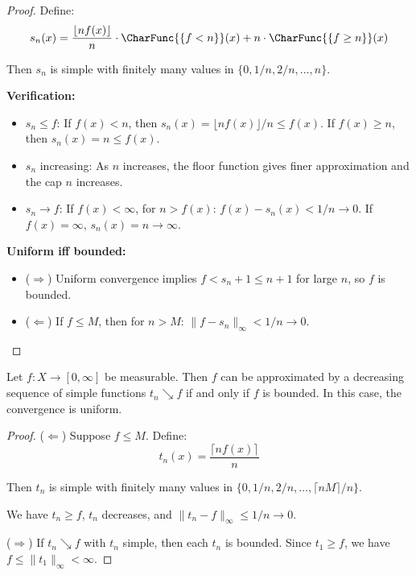 \begin{proof}
Define:
\[ s_n(x) = \frac{\lfloor n f(x) \rfloor}{n} \cdot \CharFunc{\{f < n\}}(x) + n \cdot \CharFunc{\{f \geq n\}}(x) \]

Then $s_n$ is simple with finitely many values in $\{0, 1/n, 2/n, \ldots, n\}$.

\textbf{Verification:}
\begin{itemize}
    \item $s_n \leq f$: If $f(x) < n$, then $s_n(x) = \lfloor nf(x) \rfloor / n \leq f(x)$. If $f(x) \geq n$, then $s_n(x) = n \leq f(x)$.
    \item $s_n$ increasing: As $n$ increases, the floor function gives finer approximation and the cap $n$ increases.
    \item $s_n \to f$: If $f(x) < \infty$, for $n > f(x)$: $f(x) - s_n(x) < 1/n \to 0$. If $f(x) = \infty$, $s_n(x) = n \to \infty$.
\end{itemize}

\textbf{Uniform iff bounded:}
\begin{itemize}
    \item ($\Rightarrow$) Uniform convergence implies $f < s_n + 1 \leq n + 1$ for large $n$, so $f$ is bounded.
    \item ($\Leftarrow$) If $f \leq M$, then for $n > M$: $\|f - s_n\|_\infty < 1/n \to 0$.
\end{itemize}
\end{proof}

\begin{proposition}
Let $f: X \to [0, \infty]$ be measurable. Then $f$ can be approximated by a decreasing sequence of simple functions $t_n \searrow f$ if and only if $f$ is bounded. In this case, the convergence is uniform.
\end{proposition}

\begin{proof}
($\Leftarrow$) Suppose $f \leq M$. Define:
\[ t_n(x) = \frac{\lceil n f(x) \rceil}{n} \]

Then $t_n$ is simple with finitely many values in $\{0, 1/n, 2/n, \ldots, \lceil nM \rceil / n\}$.

We have $t_n \geq f$, $t_n$ decreases, and $\|t_n - f\|_\infty \leq 1/n \to 0$.

($\Rightarrow$) If $t_n \searrow f$ with $t_n$ simple, then each $t_n$ is bounded. Since $t_1 \geq f$, we have $f \leq \|t_1\|_\infty < \infty$.
\end{proof}


